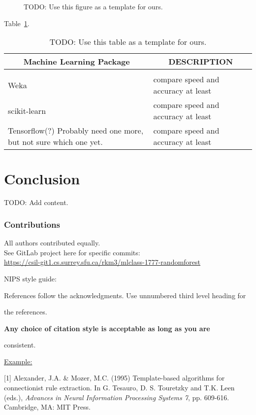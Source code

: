 \documentclass{article} %
\begin{document}
\begin{figure}[h]
\begin{center}
\fbox{\rule[-.5cm]{0cm}{4cm} \rule[-.5cm]{4cm}{0cm}}
\end{center}
\caption{TODO: Use this figure as a template for ours.}
\end{figure}

Table~\ref{sample-table}.

\begin{table}[t]
\caption{TODO: Use this table as a template for ours.}
\label{sample-table}
\begin{center}
\begin{tabular}{ll}
\multicolumn{1}{c}{\bf Machine Learning Package} &\multicolumn{1}{c}{\bf DESCRIPTION}
\\ \hline \\
Weka         &compare speed and accuracy at least \\
scikit-learn             &compare speed and accuracy at least \\
Tensorflow(?) Probably need one more, but not sure which one yet.             &compare speed and accuracy at least \\
\end{tabular}
\end{center}
\end{table}

\section{Conclusion}
TODO: Add content.

\subsubsection*{Contributions}
All authors contributed equally.\\
See GitLab project here for specific commits:\\
\href{
    https://csil-git1.cs.surrey.sfu.ca/rkm3/mlclass-1777-randomforest
}{
    https://csil-git1.cs.surrey.sfu.ca/rkm3/mlclass-1777-randomforest
}


\small{
 

}

NIPS style guide:

References follow the acknowledgments. Use unnumbered third level heading for

the references. {\bf Any choice of citation style is acceptable as long as you are

consistent.} 

\href{https://github.com/aucsc220/research_paper}{
Example:}\\

\small{
[1] Alexander, J.A. \& Mozer, M.C. (1995) Template-based algorithms
for connectionist rule extraction. In G. Tesauro, D. S. Touretzky
and T.K. Leen (eds.), {\it Advances in Neural Information Processing
Systems 7}, pp. 609-616. Cambridge, MA: MIT Press.

}
\end{document}
